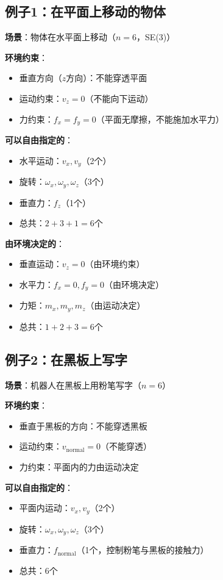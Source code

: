 \documentclass[12pt,a4paper]{article}
\begin{document}
\subsection{例子1：在平面上移动的物体}

\textbf{场景}：物体在水平面上移动（$n = 6$，SE(3)）

\textbf{环境约束}：
\begin{itemize}
\item 垂直方向（$z$方向）：不能穿透平面
\item 运动约束：$v_z = 0$（不能向下运动）
\item 力约束：$f_x = f_y = 0$（平面无摩擦，不能施加水平力）
\end{itemize}

\textbf{可以自由指定的}：
\begin{itemize}
\item 水平运动：$v_x, v_y$（2个）
\item 旋转：$\omega_x, \omega_y, \omega_z$（3个）
\item 垂直力：$f_z$（1个）
\item 总共：$2 + 3 + 1 = 6$个
\end{itemize}

\textbf{由环境决定的}：
\begin{itemize}
\item 垂直运动：$v_z = 0$（由环境约束）
\item 水平力：$f_x = 0, f_y = 0$（由环境决定）
\item 力矩：$m_x, m_y, m_z$（由运动决定）
\item 总共：$1 + 2 + 3 = 6$个
\end{itemize}

\subsection{例子2：在黑板上写字}

\textbf{场景}：机器人在黑板上用粉笔写字（$n = 6$）

\textbf{环境约束}：
\begin{itemize}
\item 垂直于黑板的方向：不能穿透黑板
\item 运动约束：$v_{\text{normal}} = 0$（不能穿透）
\item 力约束：平面内的力由运动决定
\end{itemize}

\textbf{可以自由指定的}：
\begin{itemize}
\item 平面内运动：$v_x, v_y$（2个）
\item 旋转：$\omega_x, \omega_y, \omega_z$（3个）
\item 垂直力：$f_{\text{normal}}$（1个，控制粉笔与黑板的接触力）
\item 总共：$6$个
\end{itemize}
\end{document}
